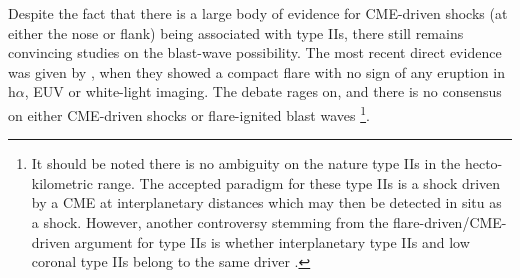 Despite the fact that there is a large body of evidence for CME-driven shocks (at either the nose or flank) being associated with type IIs, there still remains convincing studies on the blast-wave possibility. The most recent direct evidence was given by \citep{mag2012}, when they showed a compact flare with no sign of any eruption in h$\alpha$, EUV or white-light imaging. The debate rages on, and there is no consensus on either CME-driven shocks or flare-ignited blast waves \citep{vrsnak2008} \footnote{It should be noted there is no ambiguity on the nature type IIs in the hecto-kilometric range. The accepted paradigm for these type IIs is a shock driven by a CME at interplanetary distances which may then be detected in situ as a shock. However, another controversy stemming from the flare-driven/CME-driven argument for type IIs is whether interplanetary type IIs and low coronal type IIs belong to the same driver \citep{cane2005}.}.




